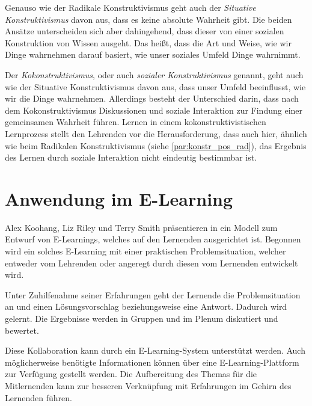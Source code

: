 Genauso wie der Radikale Konstruktivismus geht auch der \emph{Situative Konstruktivismus} davon aus, dass es keine absolute Wahrheit gibt. \cite{Anderson.1999} Die beiden Ansätze unterscheiden sich aber dahingehend, dass dieser von einer sozialen Konstruktion von Wissen ausgeht. Das heißt, dass die Art und Weise, wie wir Dinge wahrnehmen darauf basiert, wie unser soziales Umfeld Dinge wahrnimmt. \cite{Jonassen.1992} %

Der \emph{Kokonstruktivismus}, oder auch \emph{sozialer Konstruktivismus} genannt, geht auch wie der Situative Konstruktivismus davon aus, dass unser Umfeld beeinflusst, wie wir die Dinge wahrnehmen. Allerdings besteht der Unterschied darin, dass nach dem Kokonstruktivismus Diskussionen und soziale Interaktion zur Findung einer gemeinsamen Wahrheit führen. \cite{Bereiter.1994} Lernen in einem kokonstruktivistischen Lernprozess stellt den Lehrenden vor die Herausforderung, dass auch hier, ähnlich wie beim Radikalen Konstruktivismus (siehe \ref{par:konstr_pos_rad}), das Ergebnis des Lernen durch soziale Interaktion nicht eindeutig bestimmbar ist. \cite{Anderson.1999}

\section{Anwendung im E-Learning}
\label{sec:Konstr_Anwendungsfaelle}
Alex Koohang, Liz Riley und Terry Smith präsentieren in \cite[S. 95]{Koohang.2009} ein Modell zum Entwurf von E-Learnings, welches auf den Lernenden ausgerichtet ist. Begonnen wird ein solches E-Learning mit einer praktischen Problemsituation, welcher entweder vom Lehrenden oder angeregt durch diesen vom Lernenden entwickelt wird.
 
Unter Zuhilfenahme seiner Erfahrungen geht der Lernende die Problemsituation an und einen Lösungsvorschlag beziehungsweise eine Antwort. Dadurch wird gelernt. Die Ergebnisse werden in Gruppen und im Plenum diskutiert und bewertet. \cite[S. 95 f.]{Koohang.2009}

Diese Kollaboration kann durch ein E-Learning-System unterstützt werden. Auch möglicherweise benötigte Informationen können über eine E-Learning-Plattform zur Verfügung gestellt werden. \cite[S. 96]{Koohang.2009} Die Aufbereitung des Themas für die Mitlernenden kann zur besseren Verknüpfung mit Erfahrungen im Gehirn des Lernenden führen. \cite[S. 101 f.]{Koohang.2009}

